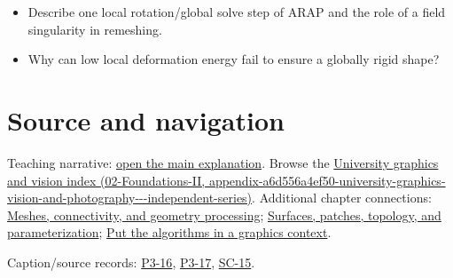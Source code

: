 \begin{itemize}
\tightlist
\item
  Describe one local rotation/global solve step of ARAP and the role of a field singularity in remeshing.
\item
  Why can low local deformation energy fail to ensure a globally rigid shape?
\end{itemize}

\section{Source and navigation}\label{appendix-7107009c505b-source-and-navigation}

Teaching narrative: \href{Continuous\%20Notes/University\%20-\%20Worlds,\%20Images\%20and\%20Inference\%20-\%20Graphics,\%20Vision\%20and\%20Photography\#Meshes,\%20connectivity,\%20and\%20geometry\%20processing}{open the main explanation}. Browse the \href{../02-Foundations-II/main.pdf\#nameddest=appendix-a6d556a4ef50-university-graphics-vision-and-photography---independent-series}{University graphics and vision index (02-Foundations-II, appendix-a6d556a4ef50-university-graphics-vision-and-photography-\/-\/-independent-series)}. Additional chapter connections: \href{Continuous\%20Notes/University\%20-\%20Worlds,\%20Images\%20and\%20Inference\%20-\%20Graphics,\%20Vision\%20and\%20Photography\#Meshes,\%20connectivity,\%20and\%20geometry\%20processing}{Meshes, connectivity, and geometry processing}; \href{Continuous\%20Notes/University\%20-\%20Worlds,\%20Images\%20and\%20Inference\%20-\%20Graphics,\%20Vision\%20and\%20Photography\#Surfaces,\%20patches,\%20topology,\%20and\%20parameterization}{Surfaces, patches, topology, and parameterization}; \href{Continuous\%20Notes/Computing\%20Foundations\%20-\%20From\%20Bits\%20to\%20C++\%20and\%20Systems\%20APIs\#Put\%20the\%20algorithms\%20in\%20a\%20graphics\%20context}{Put the algorithms in a graphics context}.

Caption/source records: \href{Continuous\%20Notes/University\%20-\%20Worlds,\%20Images\%20and\%20Inference\%20-\%20Graphics,\%20Vision\%20and\%20Photography\#P3-16\%20-\%20Subdivision\%20Surfaces\%20Part\%201}{P3-16}, \href{Continuous\%20Notes/University\%20-\%20Worlds,\%20Images\%20and\%20Inference\%20-\%20Graphics,\%20Vision\%20and\%20Photography\#P3-17\%20-\%20Subdivision\%20Surfaces\%20Part\%202}{P3-17}, \href{Continuous\%20Notes/University\%20-\%20Worlds,\%20Images\%20and\%20Inference\%20-\%20Graphics,\%20Vision\%20and\%20Photography\#SC-15\%20-\%20Stanford\%20CS231N\%20Deep\%20Learning\%20for\%20Computer\%20Vision\%20Spring\%202025\%20Lecture\%2015:\%203D\%20Vision}{SC-15}.

